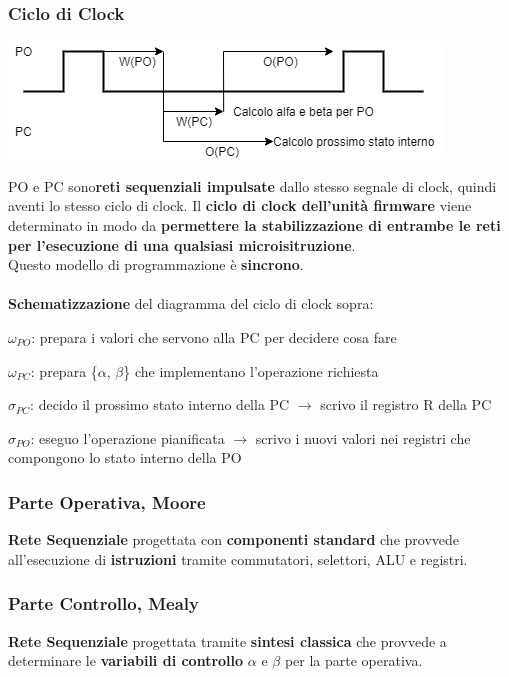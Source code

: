 \documentclass[10pt]{report}
\begin{document}
\subsubsection{Ciclo di Clock}
\begin{center}
\includegraphics[scale=1]{ufclock.png}
\end{center}
PO e PC sono\textbf{reti sequenziali impulsate} dallo stesso segnale di clock, quindi aventi lo stesso ciclo di clock. Il \textbf{ciclo di clock dell'unità firmware} viene determinato in modo da \textbf{permettere la stabilizzazione di entrambe le reti per l'esecuzione di una qualsiasi microisitruzione}.\\
Questo modello di programmazione è \textbf{sincrono}.\\\\
\textbf{Schematizzazione} del diagramma del ciclo di clock sopra:
\begin{list}{}{}
	\item $\omega_{PO}$: prepara i valori che servono alla PC per decidere cosa fare
	\item $\omega_{PC}$: prepara \{$\alpha$, $\beta$\} che implementano l'operazione richiesta
	\item $\sigma_{PC}$: decido il prossimo stato interno della PC $\rightarrow$ scrivo il registro R della PC
	\item $\sigma_{PO}$: eseguo l'operazione pianificata $\rightarrow$ scrivo i nuovi valori nei registri che compongono lo stato interno della PO
\end{list}
\subsubsection{Parte Operativa, Moore}
\textbf{Rete Sequenziale} progettata con \textbf{componenti standard} che provvede all'esecuzione di \textbf{istruzioni} tramite commutatori, selettori, ALU e registri.
\subsubsection{Parte Controllo, Mealy}
\textbf{Rete Sequenziale} progettata tramite \textbf{sintesi classica} che provvede a determinare le \textbf{variabili di controllo} $\alpha$ e $\beta$ per la parte operativa.
\end{document}
